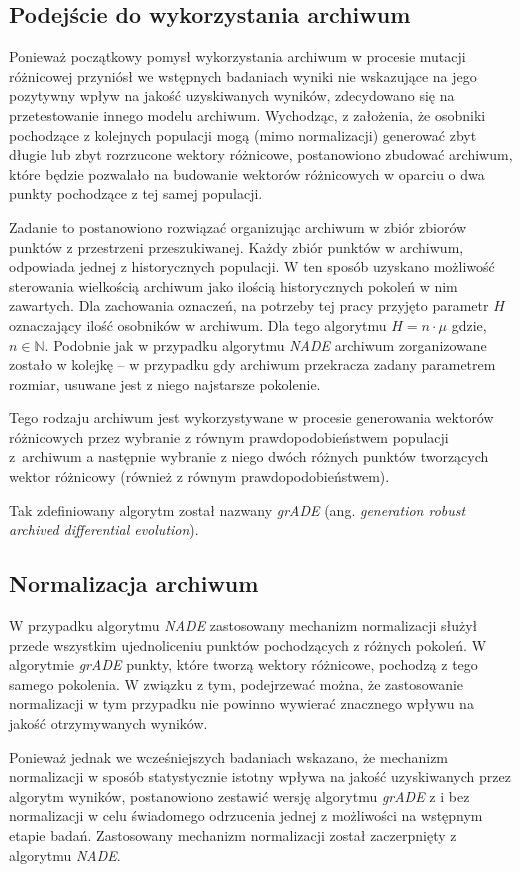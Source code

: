 \documentclass[12pt,a4paper]{report}
\begin{document}
{{{{{{\subsection{Podejście do wykorzystania archiwum}
\par{
Ponieważ początkowy pomysł wykorzystania archiwum w procesie mutacji różnicowej przyniósł we wstępnych badaniach wyniki nie wskazujące na jego pozytywny wpływ na jakość uzyskiwanych wyników, zdecydowano się na przetestowanie innego modelu archiwum. Wychodząc, z założenia, że osobniki pochodzące z kolejnych populacji mogą (mimo normalizacji) generować zbyt długie lub zbyt rozrzucone wektory różnicowe, postanowiono zbudować archiwum, które będzie pozwalało na budowanie wektorów różnicowych w oparciu o dwa punkty pochodzące z tej samej populacji.
}
\par{
Zadanie to postanowiono rozwiązać organizując archiwum w zbiór zbiorów punktów z przestrzeni przeszukiwanej. Każdy zbiór punktów w archiwum, odpowiada jednej z historycznych populacji. W ten sposób uzyskano możliwość sterowania wielkością archiwum jako ilością historycznych pokoleń w nim zawartych. Dla zachowania oznaczeń, na potrzeby tej pracy przyjęto parametr $H$ oznaczający ilość osobników w archiwum. Dla tego algorytmu $H = n \cdot \mu$ gdzie, $n \in \mathbb{N}$. Podobnie jak w przypadku algorytmu \emph{NADE} archiwum zorganizowane zostało w kolejkę -- w przypadku gdy archiwum przekracza zadany parametrem rozmiar, usuwane jest z niego najstarsze pokolenie.
}
\par{
Tego rodzaju archiwum jest wykorzystywane w procesie generowania wektorów różnicowych przez wybranie z równym prawdopodobieństwem populacji z~archiwum a następnie wybranie z niego dwóch różnych punktów tworzących wektor różnicowy (również z równym prawdopodobieństwem).
}
\par{
Tak zdefiniowany algorytm został nazwany \emph{grADE} (ang. \emph{generation robust archived differential evolution}).
}
\subsection{Normalizacja archiwum}
\par{
W przypadku algorytmu \emph{NADE} zastosowany mechanizm normalizacji służył przede wszystkim ujednoliceniu punktów pochodzących z różnych pokoleń. W algorytmie \emph{grADE} punkty, które tworzą wektory różnicowe, pochodzą z tego samego pokolenia. W związku z tym, podejrzewać można, że zastosowanie normalizacji w tym przypadku nie powinno wywierać znacznego wpływu na jakość otrzymywanych wyników.
\par{
Ponieważ jednak we wcześniejszych badaniach wskazano, że mechanizm normalizacji w sposób statystycznie istotny wpływa na jakość uzyskiwanych przez algorytm wyników, postanowiono zestawić wersję algorytmu \emph{grADE} z i bez normalizacji w celu świadomego odrzucenia jednej z możliwości na wstępnym etapie badań. Zastosowany mechanizm normalizacji został zaczerpnięty z algorytmu \emph{NADE}.
}

}}}}}}}
\end{document}
